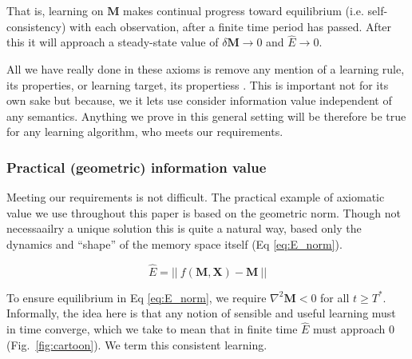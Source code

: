 That is, learning on $\mathbf{M}$ makes continual progress toward equilibrium (i.e. self-consistency) with each observation, after a finite time period has passed. After this it will approach a steady-state value of $\delta \mathbf{M} \rightarrow 0$ and $\hat E \rightarrow 0$.

All we have really done in these axioms is remove any mention of a learning rule, its properties, or learning target, its propertiess \cite{Itti2009,Jaegle2019,Schmidhuber1991,Inglis2001,Reddy2016,Pirolli2007}. This is important not for its own sake but because, we it lets use consider information value independent of any semantics. Anything we prove in this general setting will be therefore be true for any learning algorithm, who meets our requirements. 

\subsubsection{Practical (geometric) information value}
Meeting our requirements is not difficult. The practical example of axiomatic value we use throughout this paper is based on the geometric norm. Though not necessaailry a unique solution this is quite a natural way, based only the dynamics and ``shape'' of the memory space itself (Eq \ref{eq:E_norm}). 

\begin{equation}
	\label{eq:E_norm}
	\hat E = || \ f(\mathbf{M},\mathbf{X}) - \mathbf{M} \ ||
\end{equation}

To ensure equilibrium in Eq \ref{eq:E_norm}, we require $\nabla^2 \mathbf{M} < 0$ for all $ t \ge T^*$. Informally, the idea here is that any notion of sensible and useful learning must in time converge, which we take to mean that in finite time $\hat E$ must approach 0 (Fig.~\ref{fig:cartoon}). We term this consistent learning.

